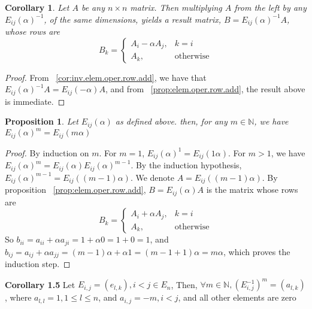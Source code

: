 \documentclass[12pt]{article}
\newtheorem{proposition}[theorem]{Proposition}
\newtheorem{corollary}[theorem]{Corollary}
\begin{document}
\begin{corollary}
Let $A$ be any $n \times n$ matrix. Then multiplying $A$ from the left by any $E_{ij}(\alpha)^{-1}$, of the same dimensions, yields a result matrix, $B=E_{ij}(\alpha)^{-1}A$, whose rows are $$
B_k=\begin{cases}
		A_i-\alpha A_j, & k=i\\
            A_k, & \text{otherwise}
		 \end{cases}
$$
\end{corollary}
\begin{proof}
From ~\ref{cor:inv.elem.oper.row.add}, we have that $E_{ij}(\alpha)^{-1}A=E_{ij}(-\alpha)A$, and from ~\ref{prop:elem.oper.row.add}, the result above is immediate.
\end{proof}
\begin{proposition} \label{prop:pow.elem.oper.row.add}
Let $E_{ij}(\alpha)$ as defined above. then, for any $m \in \mathbb{N}$, we have $E_{ij}(\alpha)^m=E_{ij}(m\alpha)$
\end{proposition}
\begin{proof}
By induction on $m$.
For $m=1$, $E_{ij}(\alpha)^1=E_{ij}(1\alpha)$. For $m>1$, we have $E_{ij}(\alpha)^m=E_{ij}(\alpha)E_{ij}(\alpha)^{m-1}$. By the induction hypothesis, $E_{ij}(\alpha)^{m-1}=E_{ij}((m-1)\alpha)$. We denote $A=E_{ij}((m-1)\alpha)$. By proposition ~\ref{prop:elem.oper.row.add}, $B=E_{ij}(\alpha)A$ is the matrix whose rows are
$$
B_k=\begin{cases}
		A_i+\alpha A_j, & k=i\\
            A_k, & \text{otherwise}
		 \end{cases}
$$
So $b_{ii}=a_{ii}+\alpha a_{ji}=1+\alpha 0=1+0=1$, and $b_{ij}=a_{ij}+\alpha a_{jj}=(m-1)\alpha+\alpha 1=(m-1+1)\alpha=m\alpha$, which proves the induction step.
\end{proof}
\newpage
\textbf{Corollary 1.5} \newline
Let $E_{i,j}=(e_{l,k}),i<j \in E_n$, Then,\newline
$\forall m \in \mathbb{N},(E_{i,j}^{-1})^m=(a_{l,k})$, where $a_{l,l}=1,1 \leq l \leq n$, and $a_{i,j}=-m,i<j$, and all other elements are zero
\end{document}
